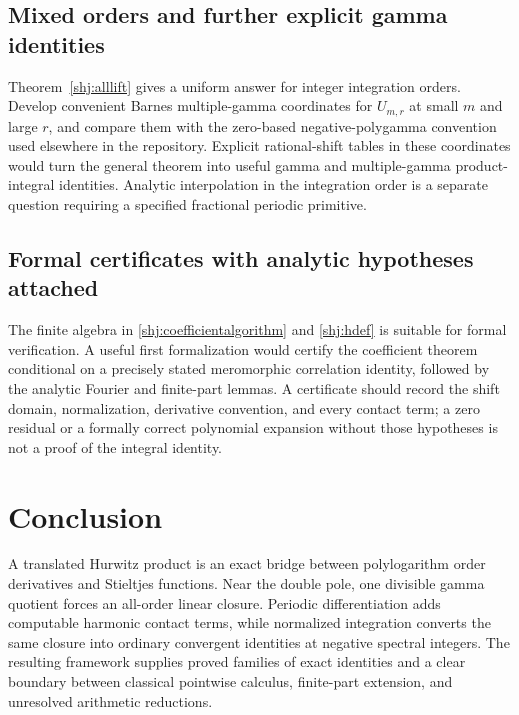 \subsection{Mixed orders and further explicit gamma identities}
Theorem~\ref{shj:alllift} gives a uniform answer for integer integration orders. Develop convenient Barnes multiple-gamma coordinates for $U_{m,r}$ at small $m$ and large $r$, and compare them with the zero-based negative-polygamma convention used elsewhere in the repository. Explicit rational-shift tables in these coordinates would turn the general theorem into useful gamma and multiple-gamma product-integral identities. Analytic interpolation in the integration order is a separate question requiring a specified fractional periodic primitive.

\subsection{Formal certificates with analytic hypotheses attached}
The finite algebra in \eqref{shj:coefficientalgorithm} and \eqref{shj:hdef} is suitable for formal verification. A useful first formalization would certify the coefficient theorem conditional on a precisely stated meromorphic correlation identity, followed by the analytic Fourier and finite-part lemmas. A certificate should record the shift domain, normalization, derivative convention, and every contact term; a zero residual or a formally correct polynomial expansion without those hypotheses is not a proof of the integral identity.

\section*{Conclusion}
A translated Hurwitz product is an exact bridge between polylogarithm order derivatives and Stieltjes functions. Near the double pole, one divisible gamma quotient forces an all-order linear closure. Periodic differentiation adds computable harmonic contact terms, while normalized integration converts the same closure into ordinary convergent identities at negative spectral integers. The resulting framework supplies proved families of exact identities and a clear boundary between classical pointwise calculus, finite-part extension, and unresolved arithmetic reductions.
